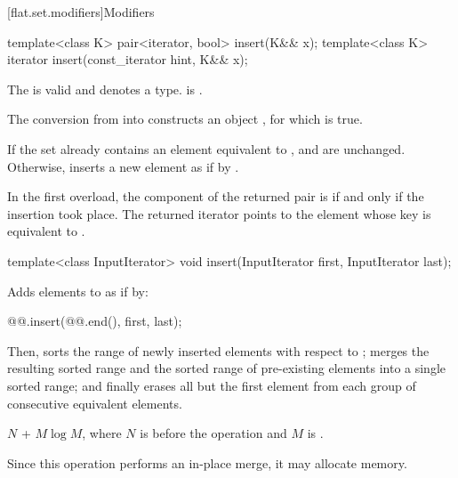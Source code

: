 [flat.set.modifiers]{Modifiers}

%
\begin{itemdecl}
template<class K> pair<iterator, bool> insert(K&& x);
template<class K> iterator insert(const_iterator hint, K&& x);
\end{itemdecl}

\begin{itemdescr}
\pnum
\constraints
The  
is valid and denotes a type.
 is .

\pnum
\expects
The conversion from  into  constructs
an object , for which  is true.

\pnum
\effects
If the set already contains an element equivalent to ,
 and  are unchanged.
Otherwise,
inserts a new element as if by .

\pnum
\returns
In the first overload,
the  component of the returned pair is 
if and only if the insertion took place.
The returned iterator points to the element
whose key is equivalent to .
\end{itemdescr}

%
\begin{itemdecl}
template<class InputIterator>
  void insert(InputIterator first, InputIterator last);
\end{itemdecl}

\begin{itemdescr}
\pnum
\effects
Adds elements to  as if by:
\begin{codeblock}
@@.insert(@@.end(), first, last);
\end{codeblock}
Then,
sorts the range of newly inserted elements with respect to ;
merges the resulting sorted range and
the sorted range of pre-existing elements into a single sorted range; and
finally erases all but the first element
from each group of consecutive equivalent elements.

\pnum
\complexity
$N$ + $M \log M$, where $N$ is  before the operation and
$M$ is .

\pnum
\remarks
Since this operation performs an in-place merge, it may allocate memory.
\end{itemdescr}

